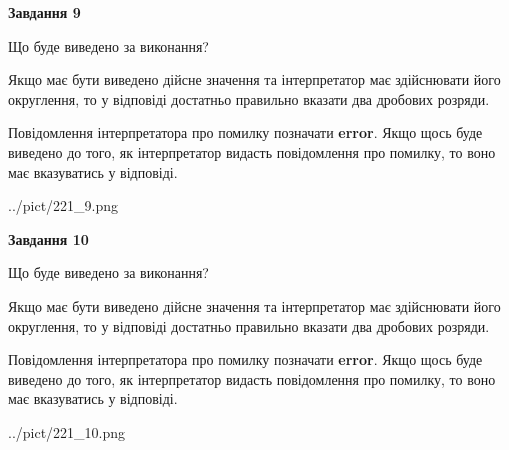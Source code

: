 \documentclass[12pt, ukrainian]{article}
\begin{document}
{\begin {Large}
{\begin {center}\textbf{Завдання 9}\end {center}}\par
Що буде виведено за виконання? \par

Якщо має бути виведено дійсне значення та інтерпретатор має здійснювати його округлення, 
то у відповіді достатньо правильно вказати два дробових розряди.

Повідомлення інтерпретатора про помилку позначати \textbf{error}.
Якщо щось буде виведено до того, як інтерпретатор видасть повідомлення про помилку, 
то воно має вказуватись у відповіді. \par

\begin{center}
	{../pict/221_9.png}
\end{center}
\newpage

{\begin {center}\textbf{Завдання 10}\end {center}}\par
Що буде виведено за виконання? \par

Якщо має бути виведено дійсне значення та інтерпретатор має здійснювати його округлення, 
то у відповіді достатньо правильно вказати два дробових розряди.

Повідомлення інтерпретатора про помилку позначати \textbf{error}.
Якщо щось буде виведено до того, як інтерпретатор видасть повідомлення про помилку, 
то воно має вказуватись у відповіді. \par

\begin{center}
	{../pict/221_10.png}
\end{center}
\newpage

\end {Large}}
\end{document}
